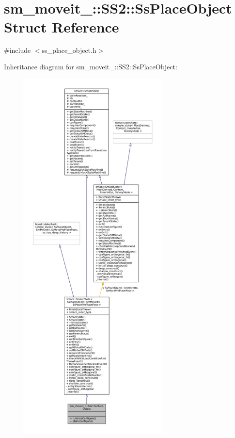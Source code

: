 \hypertarget{structsm__moveit__4_1_1SS2_1_1SsPlaceObject}{}\section{sm\+\_\+moveit\+\_\+:\+:S\+S2\+:\+:Ss\+Place\+Object Struct Reference}
\label{structsm__moveit__4_1_1SS2_1_1SsPlaceObject}


{\ttfamily \#include $<$ss\+\_\+place\+\_\+object.\+h$>$}



Inheritance diagram for sm\+\_\+moveit\+\_\+:\+:S\+S2\+:\+:Ss\+Place\+Object\+:
\nopagebreak
\begin{figure}[H]
\begin{center}
\leavevmode
\includegraphics[height=550pt]{structsm__moveit__4_1_1SS2_1_1SsPlaceObject__inherit__graph}
\end{center}
\end{figure}


